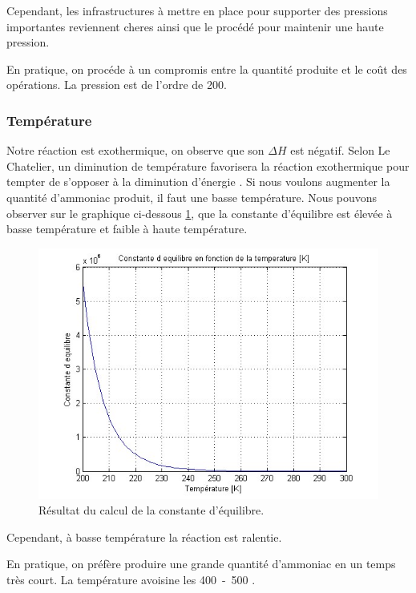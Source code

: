 Cependant, les infrastructures à mettre en place pour supporter des pressions
importantes reviennent cheres ainsi que le procédé pour maintenir une haute pression.

En pratique, on procéde à un compromis entre la quantité produite et le coût des opérations.
La pression est de l'ordre de \unit{200}{\bbar}\cite{HaberB}.

\subsubsection{Température}
Notre réaction est exothermique, on observe que son $\Delta H$ est négatif.
Selon Le Chatelier, un diminution de température favorisera la réaction 
exothermique pour tempter de s'opposer à la diminution d'énergie \cite{LeChatelier}. 
Si nous voulons augmenter la quantité d'ammoniac produit, il faut une basse température.
Nous pouvons observer sur le graphique ci-dessous \ref{fig:constantK}, que 
la constante d'équilibre est élevée à basse température et faible à haute température.

\begin{figure}
	\centering
	\includegraphics[scale=0.48]{media/grapheK200-300.jpg}
	\caption{Résultat du calcul de la constante d'équilibre.}
	\label{fig:constantK}
\end{figure}

Cependant, à basse température la réaction est ralentie. 

En pratique, on préfère produire une grande quantité d'ammoniac en un temps très court. 
La température avoisine les \unit{400-500}{\degreecelsius} \cite{HaberB}.

